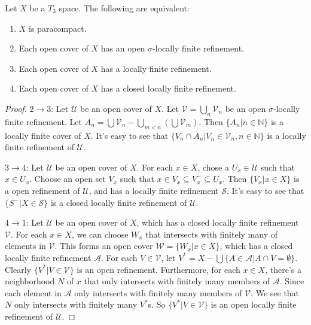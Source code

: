 \documentclass[12pt]{book}
\begin{document}
\begin{theorem}[Michael]
	Let $X$ be a $T_3$ space. The following are equivalent:
	\begin{enumerate}
		\item $X$ is paracompact.
		\item Each open cover of $X$ has an open $\sigma$-locally finite refinement.
		\item Each open cover of $X$ has a locally finite refinement.
		\item Each open cover of $X$ has a closed locally finite refinement.
	\end{enumerate}
\end{theorem}
\begin{proof}
	$2\rightarrow 3$: Let $\mathcal U$ be an open cover of $X$. Let $\mathcal V=\bigcup_n \mathcal V_n$ be an open $\sigma$-locally finite refinement. Let $A_n=\bigcup\mathcal V_n-\bigcup_{m<n}(\bigcup\mathcal V_m)$. Then $\{A_n|n\in\mathbb N\}$ is a locally finite cover of $X$. It's easy to see that $\{V_n\cap A_n|V_n\in\mathcal V_n,n\in\mathbb N\}$ is a locally finite refinement of $\mathcal U$.
	
	$3\rightarrow 4$: Let $\mathcal U$ be an open cover of $X$. For each $x\in X$, chose a $U_x\in\mathcal U$ such that $x\in U_x$. Choose an open set $V_x$ such that $x\in V_x\subseteq V_x^-\subseteq U_x$. Then $\{V_x|x\in X\}$ is a open refinement of $\mathcal U$, and has a locally finite refinement $\mathcal S$. It's easy to see that $\{S^-|X\in\mathcal S\}$ is a closed locally finite refinement of $\mathcal U$.
	
	$4\rightarrow 1$: Let $\mathcal U$ be an open cover of $X$, which has a closed locally finite refinement $\mathcal V$. For each $x\in X$, we can choose $W_x$ that intersects with finitely many of elements in $\mathcal V$. This forms an open cover $\mathcal W=\{W_x|x\in X\}$, which has a closed locally finite refinement $\mathcal A$. For each $V\in\mathcal V$, let $V^*=X-\bigcup\{A\in\mathcal A|A\cap V=\emptyset\}$. Clearly $\{V^*|V\in\mathcal V\}$ is an open  refinement. Furthermore, for each $x\in X$, there's a neighborhood $N$ of $x$ that only intersects with finitely many members of $\mathcal A$. Since each element in $\mathcal A$ only intersects with finitely many members of $\mathcal V$. We see that $N$ only intersects with finitely many $V^*$s. So $\{V^*|V\in\mathcal V\}$ is an open locally finite refinement of $\mathcal U$. 
\end{proof}
\end{document}
